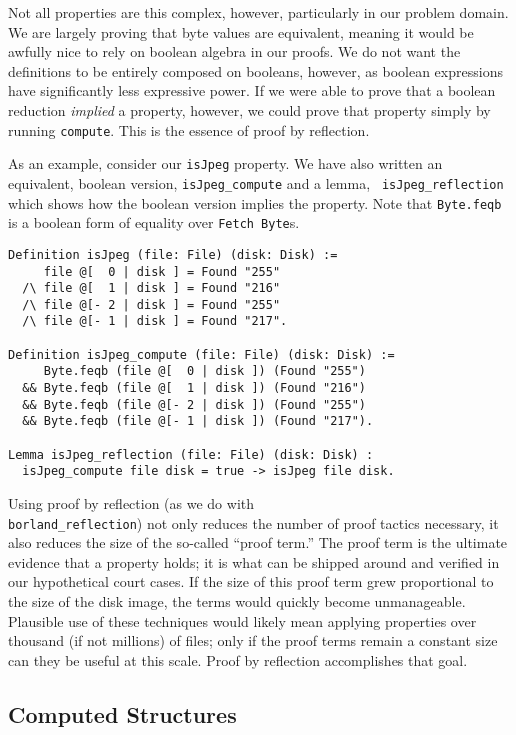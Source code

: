 \documentclass[nocopyrightspace]{sigplanconf}
\begin{document}
Not all properties are this complex, however, particularly in our problem
domain. We are largely proving that byte values are equivalent, meaning it
would be awfully nice to rely on boolean algebra in our proofs. We do not want
the definitions to be entirely composed on booleans, however, as boolean
expressions have significantly less expressive power. If we were able to prove
that a boolean reduction {\em implied} a property, however, we could prove
that property simply by running {\tt compute}. This is the essence of proof by
reflection. 

As an example, consider our {\tt isJpeg} property. We have also written an
equivalent, boolean version, {\tt isJpeg\_compute} and a lemma, {\tt
isJpeg\_reflection} which shows how the boolean version implies the property.
Note that {\tt Byte.feqb} is a boolean form of equality over {\tt Fetch
Byte}s.

\begin{lstlisting}
Definition isJpeg (file: File) (disk: Disk) :=
     file @[  0 | disk ] = Found "255"
  /\ file @[  1 | disk ] = Found "216"
  /\ file @[- 2 | disk ] = Found "255"
  /\ file @[- 1 | disk ] = Found "217".

Definition isJpeg_compute (file: File) (disk: Disk) :=
     Byte.feqb (file @[  0 | disk ]) (Found "255")
  && Byte.feqb (file @[  1 | disk ]) (Found "216")
  && Byte.feqb (file @[- 2 | disk ]) (Found "255")
  && Byte.feqb (file @[- 1 | disk ]) (Found "217").

Lemma isJpeg_reflection (file: File) (disk: Disk) :
  isJpeg_compute file disk = true -> isJpeg file disk.
\end{lstlisting}

Using proof by reflection (as we do with \\{\tt borland\_reflection}) not only
reduces the number of proof tactics necessary, it also reduces the size of the
so-called ``proof term.'' The proof term is the ultimate evidence that a
property holds; it is what can be shipped around and verified in our
hypothetical court cases. If the size of this proof term grew proportional to
the size of the disk image, the terms would quickly become unmanageable. Plausible use of these techniques would likely mean applying properties over
thousand (if not millions) of files; only if the proof terms remain a constant
size can they be useful at this scale. Proof by reflection accomplishes that
goal.

\subsection{Computed Structures}
\end{document}
